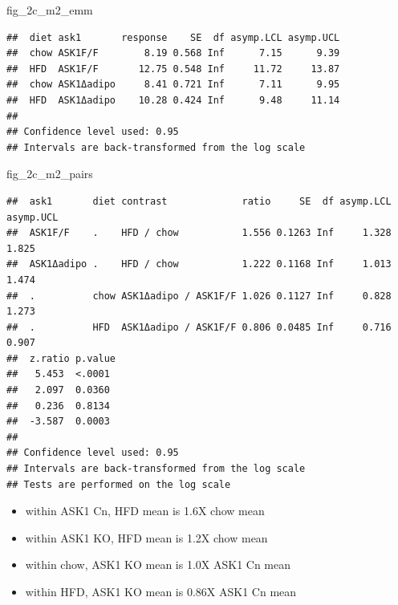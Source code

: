 \documentclass[]{book}
\newenvironment{Shaded}{\begin{snugshade}}{\end{snugshade}}
\newcommand{\CommentTok}[1]{\textcolor[rgb]{0.56,0.35,0.01}{\textit{#1}}}
\newcommand{\DataTypeTok}[1]{\textcolor[rgb]{0.13,0.29,0.53}{#1}}
\newcommand{\KeywordTok}[1]{\textcolor[rgb]{0.13,0.29,0.53}{\textbf{#1}}}
\newcommand{\NormalTok}[1]{#1}
\newcommand{\OperatorTok}[1]{\textcolor[rgb]{0.81,0.36,0.00}{\textbf{#1}}}
\newcommand{\OtherTok}[1]{\textcolor[rgb]{0.56,0.35,0.01}{#1}}
\newcommand{\StringTok}[1]{\textcolor[rgb]{0.31,0.60,0.02}{#1}}
\providecommand{\tightlist}{%
  \setlength{\itemsep}{0pt}\setlength{\parskip}{0pt}}
\begin{document}
\begin{Shaded}
\begin{Highlighting}[]
\NormalTok{fig_2c_m2_emm}
\end{Highlighting}
\end{Shaded}

\begin{verbatim}
##  diet ask1       response    SE  df asymp.LCL asymp.UCL
##  chow ASK1F/F        8.19 0.568 Inf      7.15      9.39
##  HFD  ASK1F/F       12.75 0.548 Inf     11.72     13.87
##  chow ASK1Δadipo     8.41 0.721 Inf      7.11      9.95
##  HFD  ASK1Δadipo    10.28 0.424 Inf      9.48     11.14
## 
## Confidence level used: 0.95 
## Intervals are back-transformed from the log scale
\end{verbatim}

\begin{Shaded}
\begin{Highlighting}[]
\NormalTok{fig_2c_m2_pairs}
\end{Highlighting}
\end{Shaded}

\begin{verbatim}
##  ask1       diet contrast             ratio     SE  df asymp.LCL asymp.UCL
##  ASK1F/F    .    HFD / chow           1.556 0.1263 Inf     1.328     1.825
##  ASK1Δadipo .    HFD / chow           1.222 0.1168 Inf     1.013     1.474
##  .          chow ASK1Δadipo / ASK1F/F 1.026 0.1127 Inf     0.828     1.273
##  .          HFD  ASK1Δadipo / ASK1F/F 0.806 0.0485 Inf     0.716     0.907
##  z.ratio p.value
##   5.453  <.0001 
##   2.097  0.0360 
##   0.236  0.8134 
##  -3.587  0.0003 
## 
## Confidence level used: 0.95 
## Intervals are back-transformed from the log scale 
## Tests are performed on the log scale
\end{verbatim}

\begin{itemize}
\tightlist
\item
  within ASK1 Cn, HFD mean is 1.6X chow mean
\item
  within ASK1 KO, HFD mean is 1.2X chow mean
\item
  within chow, ASK1 KO mean is 1.0X ASK1 Cn mean
\item
  within HFD, ASK1 KO mean is 0.86X ASK1 Cn mean
\end{itemize}

\begin{Shaded}
\end{Shaded}
\end{document}
